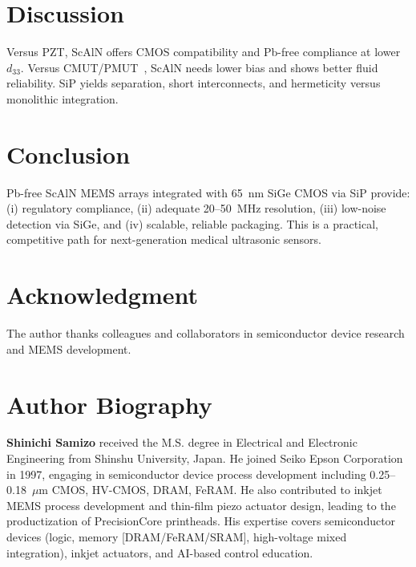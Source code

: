 \documentclass[conference]{IEEEtran}
\begin{document}
\section{Discussion}
Versus PZT, ScAlN offers CMOS compatibility and Pb-free compliance at lower $d_{33}$. Versus CMUT/PMUT~\cite{khuri2009cmut}, ScAlN needs lower bias and shows better fluid reliability. SiP yields separation, short interconnects, and hermeticity versus monolithic integration.

\section{Conclusion}
Pb-free ScAlN MEMS arrays integrated with 65~nm SiGe CMOS via SiP provide: (i) regulatory compliance, (ii) adequate 20--50~MHz resolution, (iii) low-noise detection via SiGe, and (iv) scalable, reliable packaging. This is a practical, competitive path for next-generation medical ultrasonic sensors.

\section*{Acknowledgment}
The author thanks colleagues and collaborators in semiconductor device research and MEMS development.




\section*{Author Biography}
\textbf{Shinichi Samizo} received the M.S. degree in Electrical and Electronic Engineering from Shinshu University, Japan. He joined Seiko Epson Corporation in 1997, engaging in semiconductor device process development including 0.25--0.18~$\mu$m CMOS, HV-CMOS, DRAM, FeRAM. He also contributed to inkjet MEMS process development and thin-film piezo actuator design, leading to the productization of PrecisionCore printheads. His expertise covers semiconductor devices (logic, memory [DRAM/FeRAM/SRAM], high-voltage mixed integration), inkjet actuators, and AI-based control education.
\end{document}
